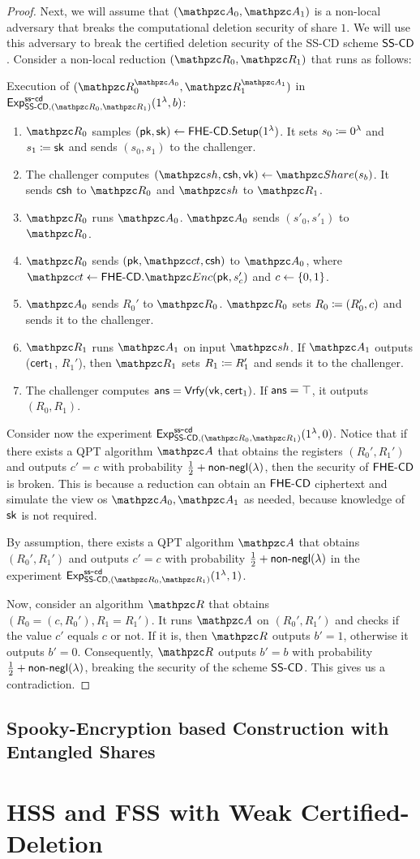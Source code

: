 \begin{proof}
Next, we will assume that $(\qA_0, \qA_1)$ is a non-local adversary
that breaks the computational deletion security of share $1$. We
will use this adversary to break the certified deletion security of
the SS-CD scheme $\mathsf{SS\textrm{-}CD}$. Consider a non-local reduction $(\qR_0,
\qR_1)$ that runs as follows:

\begin{description}
\item Execution of $(\qR_0^{\qA_0}, \qR_1^{\qA_1})$ in
$\expb{\SScd,(\qR_0, \qR_1)}{ss}{cd}(1^\secp,b)$:
\begin{enumerate}
\item $\qR_0$ samples $(\mathsf{pk}, \mathsf{sk}) \leftarrow
\mathsf{FHE\textrm{-}CD}.\mathsf{Setup}(1^\lambda)$. It sets $s_0 \coloneqq 0^\lambda$ and $s_1
\coloneqq \mathsf{sk}$ and sends $(s_0, s_1)$ to the challenger.
\item The challenger computes $(\qsh, \csh, \vk) \leftarrow
\Sh(s_b)$. It sends $\mathsf{csh}$ to $\qR_0$ and $\qsh$ to $\qR_1$.
\item $\qR_0$ runs $\qA_0$. $\qA_0$ sends $(s'_0, s'_1)$ to $\qR_0$.
\item $\qR_0$ sends $(\pk, \qct, \csh)$ to $\qA_0$, where
$\qct \leftarrow \FHEcd.\qEnc(\pk, s'_c)$ and $c \leftarrow \{0,1\}$.
\item $\qA_0$ sends $R_0'$ to $\qR_0$. $\qR_0$ sets $R_0 \coloneqq
(R_0', c)$ and sends it to the challenger.
\item $\qR_1$ runs $\qA_1$ on input $\qsh$. If $\qA_1$ outputs
($\mathsf{cert}_1$, $R_1'$), then $\qR_1$ sets $R_1 \coloneqq R_1'$ and sends
it to the challenger.
\item The challenger computes $\mathsf{ans} = \mathsf{Vrfy}(\mathsf{vk}, \mathsf{cert}_1)$. If $\mathsf{ans}
= \top$, it outputs $(R_0, R_1)$.
\end{enumerate}
\end{description}

Consider now the experiment $\expb{\SScd,(\qR_0,
\qR_1)}{ss}{cd}(1^\secp,0)$. Notice that if there exists a
QPT algorithm $\qA$ that obtains the registers $(R_0', R_1')$ and
outputs $c' = c$ with probability $\frac12 + {\mathsf{non}\textrm{-}\mathsf{negl}}(\lambda)$, then
the security of $\mathsf{FHE\textrm{-}CD}$ is broken. This is because a reduction can
obtain an $\mathsf{FHE\textrm{-}CD}$ ciphertext and simulate the view os $\qA_0,
\qA_1$ as needed, because knowledge of $\mathsf{sk}$ is not required.

By assumption, there exists a QPT algorithm $\qA$ that obtains
$(R_0', R_1')$ and outputs $c'=c$ with probability $\frac12 +
{\mathsf{non}\textrm{-}\mathsf{negl}}(\lambda)$ in the experiment $\expb{\SScd,(\qR_0,
\qR_1)}{ss}{cd}(1^\secp,1)$.

Now, consider an algorithm $\qR$ that obtains $(R_0 = (c, R_0'),
R_1 = R_1')$. It runs $\qA$ on $(R_0', R_1')$ and checks if the
value $c'$ equals $c$ or not. If it is, then $\qR$ outputs $b'=1$,
otherwise it outputs $b'=0$. Consequently, $\qR$ outputs $b'=b$ with
probability $\frac12 + {\mathsf{non}\textrm{-}\mathsf{negl}}(\lambda)$, breaking the security of
the scheme $\mathsf{SS\textrm{-}CD}$. This gives us a contradiction.
\end{proof}

\subsection{Spooky-Encryption based Construction with Entangled
Shares}

\section{HSS and FSS with Weak Certified-Deletion}

